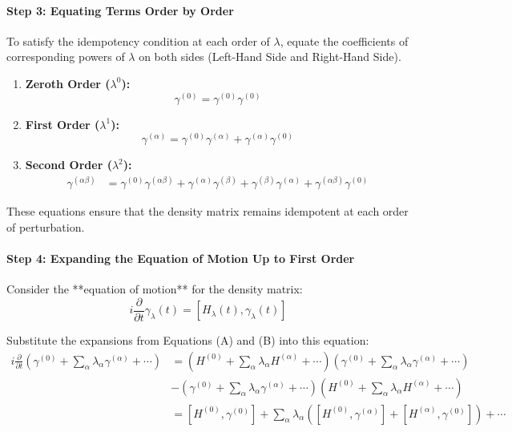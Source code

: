 \documentclass[12pt]{article}
\begin{document}
\paragraph{Step 3: Equating Terms Order by Order}

To satisfy the idempotency condition at each order of \( \lambda \), equate the coefficients of corresponding powers of \( \lambda \) on both sides (Left-Hand Side and Right-Hand Side).

\begin{enumerate}
    \item \textbf{Zeroth Order (\( \lambda^0 \)):}
    \begin{equation}
    \gamma^{(0)} = \gamma^{(0)} \gamma^{(0)} 
    \end{equation}
    
    \item \textbf{First Order (\( \lambda^1 \)):}
    \begin{equation}
    \gamma^{(\alpha)} = \gamma^{(0)} \gamma^{(\alpha)} + \gamma^{(\alpha)} \gamma^{(0)} 
    \end{equation}
    
    \item \textbf{Second Order (\( \lambda^2 \)):}
    \begin{align}
    \gamma^{(\alpha \beta)} &= \gamma^{(0)} \gamma^{(\alpha \beta)} + \gamma^{(\alpha)} \gamma^{(\beta)} + \gamma^{(\beta)} \gamma^{(\alpha)} + \gamma^{(\alpha \beta)} \gamma^{(0)} 
    \end{align}
\end{enumerate}

These equations ensure that the density matrix remains idempotent at each order of perturbation.

\paragraph{Step 4: Expanding the Equation of Motion Up to First Order}

Consider the **equation of motion** for the density matrix:
\begin{equation}
i \frac{\partial}{\partial t} \gamma_{\lambda}(t) = [H_{\lambda}(t), \gamma_{\lambda}(t)] 
\end{equation}

Substitute the expansions from Equations (A) and (B) into this equation:
\begin{align}
i \frac{\partial}{\partial t} \left( \gamma^{(0)} + \sum_{\alpha} \lambda_{\alpha} \gamma^{(\alpha)} + \cdots \right) &= \left( H^{(0)} + \sum_{\alpha} \lambda_{\alpha} H^{(\alpha)} + \cdots \right) \left( \gamma^{(0)} + \sum_{\alpha} \lambda_{\alpha} \gamma^{(\alpha)} + \cdots \right) \nonumber \\
&- \left( \gamma^{(0)} + \sum_{\alpha} \lambda_{\alpha} \gamma^{(\alpha)} + \cdots \right) \left( H^{(0)} + \sum_{\alpha} \lambda_{\alpha} H^{(\alpha)} + \cdots \right) \nonumber \\
&= [H^{(0)}, \gamma^{(0)}] + \sum_{\alpha} \lambda_{\alpha} \left( [H^{(0)}, \gamma^{(\alpha)}] + [H^{(\alpha)}, \gamma^{(0)}] \right) + \cdots \end{align}
\end{document}
